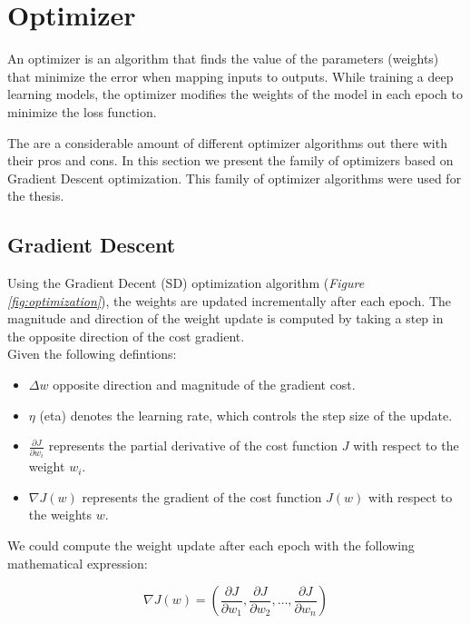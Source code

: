 \section{Optimizer}

An optimizer is an algorithm that finds the value of the parameters (weights)
that minimize the error when mapping inputs to outputs. While training a deep
learning models, the optimizer modifies the weights of the model in each epoch
to minimize the loss function. \newline

The are a considerable amount of different optimizer algorithms out there with
their pros and cons. In this section we present the family of optimizers based
on Gradient Descent optimization. This family of optimizer algorithms were used
for the thesis. \newline

\subsection{Gradient Descent}

Using the Gradient Decent (SD) optimization algorithm (\textit{Figure
\ref{fig:optimization}}), the weights are updated incrementally after each
epoch. The magnitude and direction of the weight update is computed by taking a
step in the opposite direction of the cost gradient. \\

Given the following defintions:

\begin{itemize}
  \item \(\Delta w\) opposite direction and magnitude of the gradient cost.
  \item \(\eta\) (eta) denotes the learning rate, which controls the step size of the update.
  \item  \(\frac{\partial J}{\partial w_i}\) represents the partial derivative of the cost function \(J\) with respect to the weight \(w_i\).
  \item \(\nabla J(w)\) represents the gradient of the cost function \(J(w)\) with respect to the weights \(w\).
\end{itemize}

We could compute the weight update after each epoch with the following
mathematical expression:

\[\nabla J(w) = (\frac{\partial J}{\partial w_1}, \frac{\partial J}{\partial w_2}, \ldots, \frac{\partial J}{\partial w_n})\]

